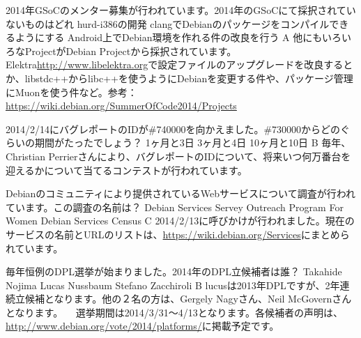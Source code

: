 %

\santaku
{2014年GSoCのメンター募集が行われています。2014年のGSoCにて採択されていないものはどれ}
{hurd-i386の開発}
{clangでDebianのパッケージをコンパイルできるようにする}
{Android上でDebian環境を作れる件の改良を行う}
{A}
{他にもいろいろなProjectがDebian Projectから採択されています。Elektra\url{http://www.libelektra.org}で設定ファイルのアップグレードを改良するとか、libstdc++からlibc++を使うようにDebianを変更する件や、パッケージ管理にMuonを使う件など。参考：\url{https://wiki.debian.org/SummerOfCode2014/Projects}}

\santaku
{2014/2/14にバグレポートのIDが\#740000を向かえました。\#730000からどのぐらいの期間がたったでしょう？}
{1ヶ月と3日}
{3ヶ月と4日}
{10ヶ月と10日}
{B}
{毎年、Christian Perrierさんにより、バグレポートのIDについて、将来いつ何万番台を迎えるかについて当てるコンテストが行われています。}

\santaku
{Debianのコミュニティにより提供されているWebサービスについて調査が行われています。この調査の名前は？}
{Debian Services Servey}
{Outreach Program For Women}
{Debian Services Census}
{C}
{2014/2/13に呼びかけが行われました。現在のサービスの名前とURLのリストは、\url{https://wiki.debian.org/Services}にまとめられています。}

\santaku
{毎年恒例のDPL選挙が始まりました。2014年のDPL立候補者は誰？}
{Takahide Nojima}
{Lucas Nussbaum}
{Stefano Zacchiroli}
{B}
{lucusは2013年DPLですが、2年連続立候補となります。他の２名の方は、Gergely Nagyさん、Neil McGovernさんとなります。
　選挙期間は2014/3/31〜4/13となります。各候補者の声明は、\url{http://www.debian.org/vote/2014/platforms/}に掲載予定です。}
